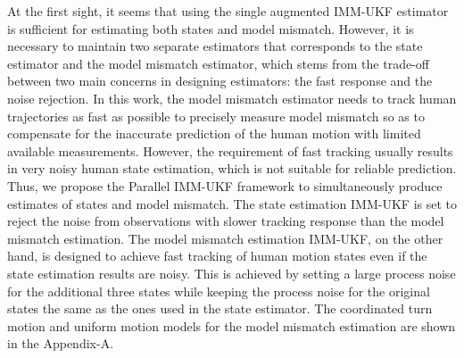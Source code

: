 \documentclass[journal]{IEEEtran}
\begin{document}
    At the first sight, it seems that using the single augmented IMM-UKF estimator is sufficient for estimating both states and model mismatch.    
    However, it is necessary to maintain two separate estimators that corresponds to the state estimator and the  model mismatch estimator, which stems from the trade-off between two main concerns in designing estimators: the fast response and the noise rejection.
    In this work, the model mismatch estimator needs to track human trajectories as fast as possible to precisely measure model mismatch so as to compensate for the inaccurate prediction of the human motion with limited available measurements.
	However, the requirement of fast tracking usually results in very noisy human state estimation, which is not suitable for reliable prediction.
   Thus, we propose the Parallel IMM-UKF framework to simultaneously produce estimates of states and model mismatch. 
    The state estimation IMM-UKF is set to reject the noise from observations with slower tracking response than the model mismatch estimation. 
    The model mismatch estimation IMM-UKF, on the other hand, is designed to achieve fast tracking of human motion states even if the state estimation results are noisy.
    This is achieved by setting a large process noise for the additional three states while keeping the process noise for the original states the same as the ones used in the state estimator.
    The coordinated turn motion and uniform motion models for the model mismatch estimation are shown in the Appendix-A.           
\end{document}
